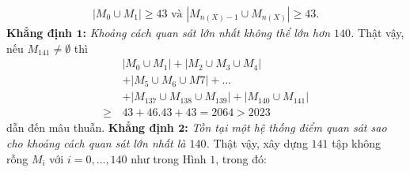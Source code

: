 \begin{multicols}{2}
\begin{align*}
		|M_0 \cup M_1| \ge 43 \text{ và } |M_{n(X)-1} \cup M_{n(X)}| \ge 43.
	\end{align*}
	\textbf{\color{cackithi}Khẳng định $\pmb{1}$:} \textit{Khoảng cách quan sát lớn nhất không thể lớn hơn $140$.} 
	\vskip 0.1cm
	Thật vậy, nếu $M_{141} \neq \emptyset$ thì 
	\begin{align*}
		& |M_0 \cup M_1| + |M_2 \cup M_3 \cup M_4| \\
		&+ |M_5 \cup M_6 \cup M7| + \ldots \\
		&+ |M_{137} \cup M_{138} \cup M_{139}| + |M_{140} \cup M_{141}| \\
		\ge \,&43 + 46.43 + 43 = 2064 > 2023
	\end{align*}
	dẫn đến mâu thuẫn.
	\vskip 0.1cm
		\textbf{\color{cackithi}Khẳng định $\pmb{2}$:} \textit{Tồn tại một hệ thống điểm quan sát sao cho khoảng cách quan sát lớn nhất là $140$.} 
		\vskip 0.1cm
		Thật vậy, xây dựng $141$ tập không rỗng $M_i$ với $i = 0, \ldots, 140$ như trong Hình $1$, trong đó:
		\vskip 0.1cm
		\begin{figure}[H]
				\vspace*{-5pt}
				\centering
				\captionsetup{labelformat= empty, justification=centering}
\end{figure}
\end{multicols}
